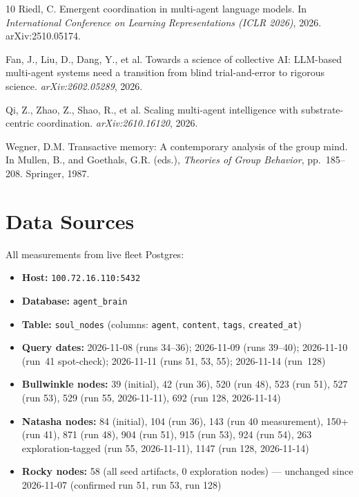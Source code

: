 \documentclass[11pt]{article}
\begin{document}
\begin{thebibliography}{10}
Riedl, C.
\newblock Emergent coordination in multi-agent language models.
\newblock In \emph{International Conference on Learning Representations (ICLR 2026)}, 2026. arXiv:2510.05174.

Fan, J., Liu, D., Dang, Y., et al.
\newblock Towards a science of collective AI: LLM-based multi-agent systems need a transition from blind trial-and-error to rigorous science.
\newblock \emph{arXiv:2602.05289}, 2026.

Qi, Z., Zhao, Z., Shao, R., et al.
\newblock Scaling multi-agent intelligence with substrate-centric coordination.
\newblock \emph{arXiv:2610.16120}, 2026.

Wegner, D.M.
\newblock Transactive memory: A contemporary analysis of the group mind.
\newblock In Mullen, B., and Goethals, G.R. (eds.), \emph{Theories of Group Behavior}, pp.\ 185--208. Springer, 1987.

\end{thebibliography}

\appendix

\section{Data Sources}

All measurements from live fleet Postgres:
\begin{itemize}
  \item \textbf{Host:} \texttt{100.72.16.110:5432}
  \item \textbf{Database:} \texttt{agent\_brain}
  \item \textbf{Table:} \texttt{soul\_nodes} (columns: \texttt{agent}, \texttt{content}, \texttt{tags}, \texttt{created\_at})
  \item \textbf{Query dates:} 2026-11-08 (runs 34--36); 2026-11-09 (runs 39--40); 2026-11-10 (run~41 spot-check); 2026-11-11 (runs 51, 53, 55); 2026-11-14 (run~128)
  \item \textbf{Bullwinkle nodes:} 39 (initial), 42 (run 36), 520 (run 48), 523 (run 51), 527 (run 53), 529 (run 55, 2026-11-11), 692 (run 128, 2026-11-14)
  \item \textbf{Natasha nodes:} 84 (initial), 104 (run 36), 143 (run 40 measurement), 150+ (run 41), 871 (run 48), 904 (run 51), 915 (run 53), 924 (run 54), 263 exploration-tagged (run 55, 2026-11-11), 1147 (run 128, 2026-11-14)
  \item \textbf{Rocky nodes:} 58 (all seed artifacts, 0 exploration nodes) --- unchanged since 2026-11-07 (confirmed run 51, run 53, run 128)
\end{itemize}
\end{document}
